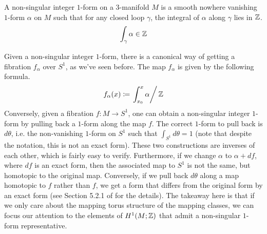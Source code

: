 \begin{defn}
  A non-singular integer $1$-form on a $3$-manifold $M$ is a smooth nowhere vanishing $1$-form $\alpha$ on
  $M$ such that for any closed loop $\gamma$, the integral of $\alpha$ along $\gamma$ lies in $\mathbb{Z}$.
  \begin{align*}
    \int_{\gamma} \alpha \in \mathbb{Z}
  \end{align*}
\end{defn}

Given a non-singular integer $1$-form, there is a canonical way of getting a fibration $f_{\alpha}$ over
$S^1$, as we've seen before. The map $f_{\alpha}$ is given by the following formula.
\begin{align*}
  f_{\alpha}(x) \coloneqq \left. \int_{x_0}^x \alpha \right/ \mathbb{Z}
\end{align*}
Conversely, given a fibration $f: M \to S^1$, one can obtain a non-singular integer $1$-form by
pulling back a $1$-form along the map $f$. The correct $1$-form to pull back is $d\theta$, i.e.  the
non-vanishing $1$-form on $S^1$ such that $\int_{S^1} d\theta = 1$ (note that despite the notation,
this is not an exact form). These two constructions are inverses of each other, which is fairly easy
to verify. Furthermore, if we change $\alpha$ to $\alpha + df$, where $df$ is an exact form, then
the associated map to $S^1$ is not the same, but homotopic to the original map. Conversely, if we
pull back $d\theta$ along a map homotopic to $f$ rather than $f$, we get a form that differs from
the original form by an exact form (see Section 5.2.1 of \cite{calegari2007foliations} for the
details). The takeaway here is that if we only care about the mapping torus structure of the mapping
classes, we can focus our attention to the elements of $H^1(M; \mathbb{Z})$ that admit a non-singular $1$-form
representative.

